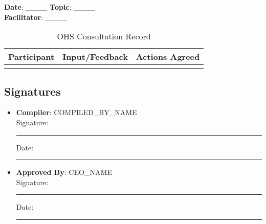 \documentclass[11pt]{article}
\newcommand{\compilerName}{{{COMPILED_BY_NAME}}}
\begin{document}
\textbf{Date}: \_\_\_\_ \textbf{Topic}: \_\_\_\_ \\
\textbf{Facilitator}: \_\_\_\_

\begin{table}[h]
    \centering
    \begin{tabular}{p{3cm}p{4cm}p{3cm}}
        \toprule
        \textbf{Participant} & \textbf{Input/Feedback} & \textbf{Actions Agreed} \\
        \midrule
        & & \\
        \bottomrule
    \end{tabular}
    \caption{OHS Consultation Record}
\end{table}

\subsection*{Signatures}
\begin{itemize}
  \item \textbf{Compiler}: \compilerName \\
    Signature: \rule{5cm}{0.4pt} \quad Date: \rule{3cm}{0.4pt}
  \item \textbf{Approved By}: {{CEO_NAME}} \\
    Signature: \rule{5cm}{0.4pt} \quad Date: \rule{3cm}{0.4pt}
\end{itemize}
\end{document}
